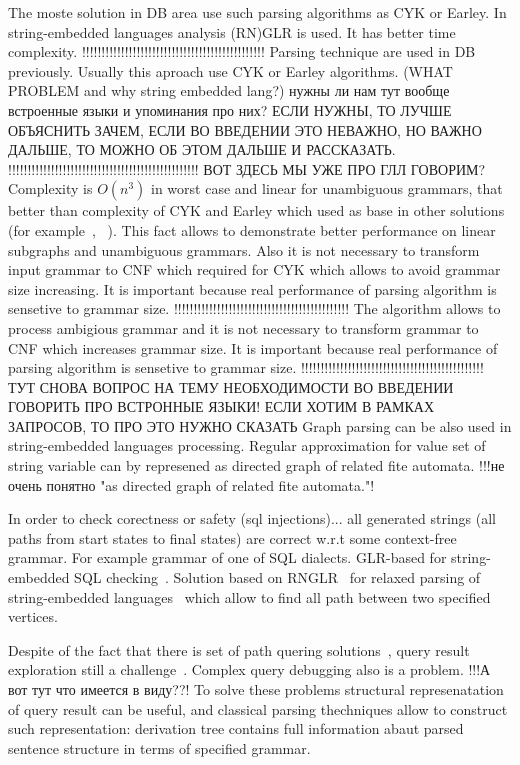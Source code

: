 \documentclass{sig-alternate} %
\begin{document}
The moste solution in DB area use such parsing algorithms as CYK or Earley.
In string-embedded languages analysis (RN)GLR is used.
It has better time complexity.
!!!!!!!!!!!!!!!!!!!!!!!!!!!!!!!!!!!!!!!!!!!!!!!
Parsing technique are used in DB previously. Usually this aproach use CYK or Earley algorithms. (WHAT PROBLEM and why string embedded lang?) нужны ли нам тут вообще встроенные языки и упоминания про них? ЕСЛИ НУЖНЫ, ТО ЛУЧШЕ ОБЪЯСНИТЬ ЗАЧЕМ, ЕСЛИ ВО ВВЕДЕНИИ ЭТО НЕВАЖНО, НО ВАЖНО ДАЛЬШЕ, ТО МОЖНО ОБ ЭТОМ ДАЛЬШЕ И РАССКАЗАТЬ.
!!!!!!!!!!!!!!!!!!!!!!!!!!!!!!!!!!!!!!!!!!!!!!!!!
ВОТ ЗДЕСЬ МЫ УЖЕ ПРО ГЛЛ ГОВОРИМ?
Complexity is $O(n^3)$ in worst case and linear for unambiguous grammars, that better than complexity of CYK and Earley which used as base in other solutions (for example~\cite{ConjCFPathQuery}, ~\cite{GraphQueryWithEarley}).
This fact allows to demonstrate better performance on linear subgraphs and unambiguous grammars.
Also it is not necessary to transform input grammar to CNF which required for CYK which allows to avoid grammar size increasing.
It is important because real performance of parsing algorithm is sensetive to grammar size.
!!!!!!!!!!!!!!!!!!!!!!!!!!!!!!!!!!!!!!!!!!!!!
The algorithm allows to process ambigious grammar and it is not necessary to transform grammar to CNF which increases grammar size. It is important because real performance of parsing algorithm is sensetive to grammar size.
!!!!!!!!!!!!!!!!!!!!!!!!!!!!!!!!!!!!!!!!!!!!!!!
ТУТ СНОВА ВОПРОС НА ТЕМУ НЕОБХОДИМОСТИ ВО ВВЕДЕНИИ ГОВОРИТЬ ПРО ВСТРОННЫЕ ЯЗЫКИ! ЕСЛИ ХОТИМ В РАМКАХ ЗАПРОСОВ, ТО ПРО ЭТО НУЖНО СКАЗАТЬ
Graph parsing can be also used in string-embedded languages processing. 
Regular approximation for value set of string variable can by represened as directed graph of related fite automata. !!!не очень понятно "as directed graph of related fite automata."!

In order to check corectness or safety (sql injections)... all generated strings (all paths from start states to final states) are correct w.r.t some context-free grammar.
For example grammar of one of SQL dialects.
GLR-based for string-embedded SQL checking~\cite{Alvor1, Alvor2}.
Solution based on RNGLR~\cite{rnglr} for relaxed parsing of string-embedded languages~\cite{relaxedRNGLR} which allow to find all path between two specified vertices.

Despite of the fact that there is set of path quering solutions~\cite{GraphQueryWithEarley, ConjCFPathQuery, !!!}, query result exploration still a challenge~\cite{hofman2015separabilityForRegQueryDebugging}. 
Complex query debugging also is a problem. !!!А вот тут что имеется в виду??!
To solve these problems structural represenatation of query result can be useful, and classical parsing thechniques allow to construct such representation: derivation tree contains full information abaut parsed sentence structure in terms of specified grammar.
\end{document}
